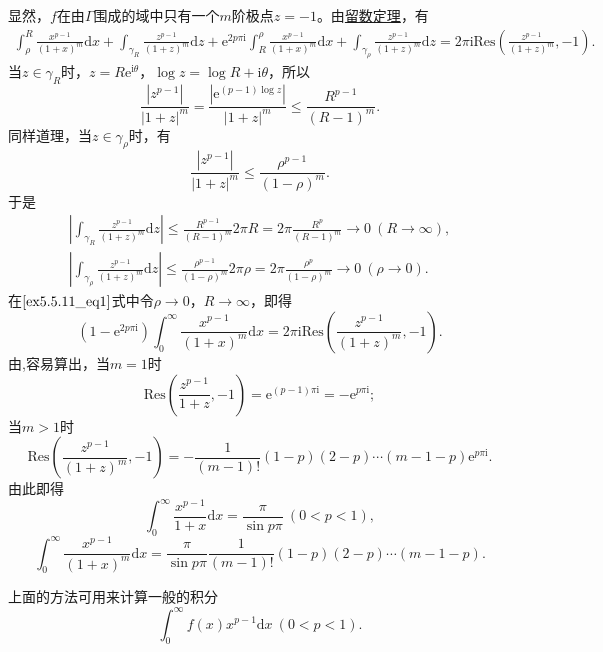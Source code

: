 \documentclass[../../main.tex]{subfiles}
\begin{document}
\begin{solution}
显然，\( f \)在由\( \Gamma \)围成的域中只有一个\( m \)阶极点\( z = -1 \)。由\hyperref[theorem:留数定理(残数定理)-定理5.4.9]{留数定理}，有
\begin{align}
\int_{\rho}^{R} \frac{x^{p - 1}}{(1 + x)^m} \mathrm{d}x + \int_{\gamma_R} \frac{z^{p - 1}}{(1 + z)^m} \mathrm{d}z + \mathrm{e}^{2p\pi \mathrm{i}} \int_{R}^{\rho} \frac{x^{p - 1}}{(1 + x)^m} \mathrm{d}x
+ \int_{\gamma_{\rho}} \frac{z^{p - 1}}{(1 + z)^m} \mathrm{d}z = 2\pi \mathrm{i} \mathrm{Res}\left( \frac{z^{p - 1}}{(1 + z)^m}, -1 \right). \label{ex5.5.11_eq1}
\end{align}
当\( z \in \gamma_R \)时，\( z = R\mathrm{e}^{\mathrm{i}\theta} \)，\( \log z = \log R + \mathrm{i}\theta \)，所以
\[
\frac{|z^{p - 1}|}{|1 + z|^m} = \frac{|\mathrm{e}^{(p - 1)\log z}|}{|1 + z|^m} \leqslant \frac{R^{p - 1}}{(R - 1)^m}.
\]
同样道理，当\( z \in \gamma_{\rho} \)时，有
\[
\frac{|z^{p - 1}|}{|1 + z|^m} \leqslant \frac{\rho^{p - 1}}{(1 - \rho)^m}.
\]
于是
\begin{gather*}
\left| \int_{\gamma_R} \frac{z^{p - 1}}{(1 + z)^m} \mathrm{d}z \right| \leqslant \frac{R^{p - 1}}{(R - 1)^m} 2\pi R
= 2\pi \frac{R^p}{(R - 1)^m}
\to 0 \ (R \to \infty),
\\
\left| \int_{\gamma_{\rho}} \frac{z^{p - 1}}{(1 + z)^m} \mathrm{d}z \right| \leqslant \frac{\rho^{p - 1}}{(1 - \rho)^m} 2\pi \rho
= 2\pi \frac{\rho^p}{(1 - \rho)^m}
\to 0 \ (\rho \to 0).
\end{gather*}
在\(\eqref{ex5.5.11_eq1}\)式中令\( \rho \to 0 \)，\( R \to \infty \)，即得
\[
(1 - \mathrm{e}^{2p\pi \mathrm{i}}) \int_{0}^{\infty} \frac{x^{p - 1}}{(1 + x)^m} \mathrm{d}x = 2\pi \mathrm{i} \mathrm{Res}\left( \frac{z^{p - 1}}{(1 + z)^m}, -1 \right).
\]
由,容易算出，当\( m = 1 \)时
\[
\mathrm{Res}\left( \frac{z^{p - 1}}{1 + z}, -1 \right) = \mathrm{e}^{(p - 1)\pi \mathrm{i}} = -\mathrm{e}^{p\pi \mathrm{i}};
\]
当\( m > 1 \)时
\[
\mathrm{Res}\left( \frac{z^{p - 1}}{(1 + z)^m}, -1 \right) = -\frac{1}{(m - 1)!}(1 - p)(2 - p)
\cdots (m - 1 - p) \mathrm{e}^{p\pi \mathrm{i}}.
\]
由此即得
\[
\int_{0}^{\infty} \frac{x^{p - 1}}{1 + x} \mathrm{d}x = \frac{\pi}{\sin p\pi} \ (0 < p < 1),
\]
\[
\int_{0}^{\infty} \frac{x^{p - 1}}{(1 + x)^m} \mathrm{d}x = \frac{\pi}{\sin p\pi} \frac{1}{(m - 1)!}(1 - p)(2 - p)
\cdots (m - 1 - p).
\]

\end{solution}
\begin{remark}
上面的方法可用来计算一般的积分
\[
\int_{0}^{\infty} f(x) x^{p - 1} \mathrm{d}x \ (0 < p < 1).
\]
\end{remark}
\end{document}
